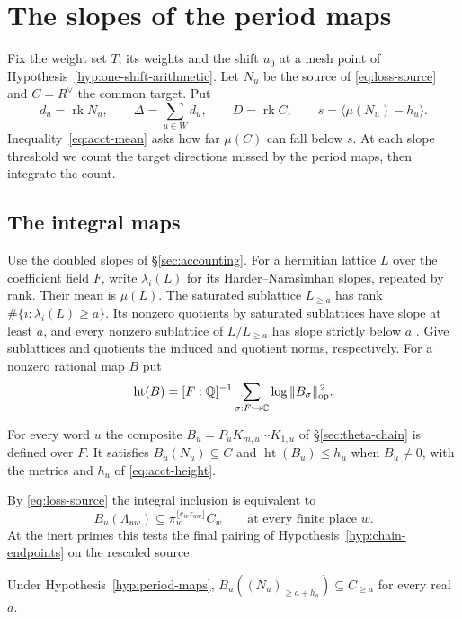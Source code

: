 \section{The slopes of the period maps}\label{sec:period-slopes}

Fix the weight set $T$, its weights and the shift $u_0$ at a mesh point of
Hypothesis~\ref{hyp:one-shift-arithmetic}. Let $N_u$ be the source
of \eqref{eq:loss-source} and $C=R^\vee$ the common target. Put
\[
 d_u=\operatorname{rk}N_u,\qquad \Delta=\sum_{u\in W}d_u,\qquad
 D=\operatorname{rk}C,\qquad s=\langle\mu(N_u)-h_u\rangle .
\]
Inequality~\eqref{eq:acct-mean} asks how far $\mu(C)$ can fall below $s$.
At each slope threshold we count the target directions missed by the
period maps, then integrate the count.

\subsection{The integral maps}

Use the doubled slopes of \S\ref{sec:accounting}. For a hermitian
lattice $L$ over the coefficient field $F$, write $\lambda_i(L)$ for
its Harder--Narasimhan slopes, repeated by rank. Their mean is
$\mu(L)$. The saturated sublattice $L_{\ge a}$ has rank
$\#\{i:\lambda_i(L)\ge a\}$. Its nonzero quotients by saturated
sublattices have slope at least $a$, and every nonzero sublattice of
$L/L_{\ge a}$ has slope strictly below $a$
\citep[\S5]{gaudron-pentes}. Give sublattices and quotients the
induced and quotient norms, respectively. For a nonzero rational map
$B$ put
\[
 \operatorname{ht}(B)=[F:\mathbb Q]^{-1}
   \sum_{\sigma:F\hookrightarrow\mathbb C}\log\|B_\sigma\|_{\rm op}^{\,2}.
\]

\begin{hypothesis}[\openinput]\label{hyp:period-maps}
For every word $u$ the composite $B_u=P_uK_{m,u}\cdots K_{1,u}$ of
\S\ref{sec:theta-chain} is defined over $F$. It satisfies
$B_u(N_u)\subseteq C$ and $\operatorname{ht}(B_u)\le h_u$ when
$B_u\ne0$, with the metrics and $h_u$ of \eqref{eq:acct-height}.
\end{hypothesis}

By \eqref{eq:loss-source} the integral inclusion is equivalent to
\[
 B_u(\Lambda_{uw})\subseteq
       \pi_w^{\lfloor e_wz_{uw}\rfloor}C_w
       \qquad\text{at every finite place }w.
\]
At the inert primes this tests the final pairing of
Hypothesis~\ref{hyp:chain-endpoints} on the rescaled source.

\begin{lemma}\label{lem:period-filtration}
Under Hypothesis~\ref{hyp:period-maps},
$B_u((N_u)_{\ge a+h_u})\subseteq C_{\ge a}$ for every real $a$.
\end{lemma}

